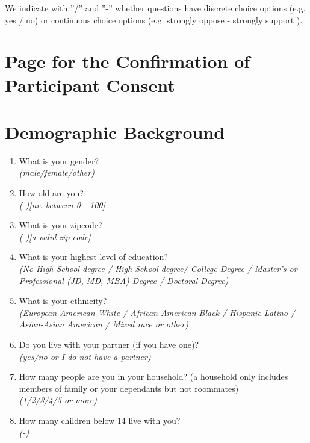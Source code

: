 \documentclass[11pt]{article}
\begin{document}

\noindent We indicate with ”/” and ”-” whether questions have discrete choice options (e.g. yes / no) or continuous choice options (e.g. strongly oppose - strongly support ). 
\section*{Page for the Confirmation of Participant Consent}
\section*{Demographic Background}
\begin{enumerate}
    \item What is your gender? \\ \textit{(male/female/other)} 
    \item How old are you? \\ \textit{(-)[nr. between 0 - 100]}
    \item What is your zipcode? \\ \textit{(-)[a valid zip code]}
    \item What is your highest level of education? \\ \textit{(No High School degree / High School degree/ College Degree / Master’s or Professional (JD, MD, MBA) Degree / Doctoral Degree)}
    \item What is your ethnicity? \\ \textit{(European American-White / African American-Black / Hispanic-Latino / Asian-Asian American / Mixed race or other)}
    \item Do you live with your partner (if you have one)? \\ \textit{(yes/no or I do not have a partner)}
    \item How many people are you in your household? (a household only includes members of family or your dependants but not roommates) \\ \textit{(1/2/3/4/5 or more)}
    \item How many children below 14 live with you? \\ \textit{(-)}

\end{enumerate}
\end{document}
